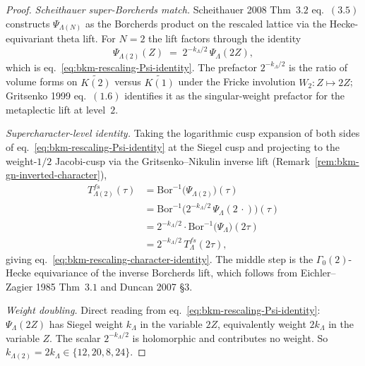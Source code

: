 \begin{proof}
\emph{Scheithauer super-Borcherds match.} Scheithauer 2008
Thm~$3.2$ eq.~$(3.5)$ constructs $\Psi_{\Lambda(N)}$ as the
Borcherds product on the rescaled lattice via the Hecke-equivariant
theta lift. For $N=2$ the lift factors through the identity
\[
 \Psi_{\Lambda(2)}(Z)
 \;=\; 2^{-k_\Lambda/2}\,\Psi_\Lambda(2Z),
\]
which is eq.~\eqref{eq:bkm-rescaling-Psi-identity}. The prefactor
$2^{-k_\Lambda/2}$ is the ratio of volume forms on
$\widetilde{K(2)}$ versus $\widetilde{K(1)}$ under the Fricke
involution $W_2\colon Z\mapsto 2Z$; Gritsenko 1999 eq.~$(1.6)$
identifies it as the singular-weight prefactor for the metaplectic
lift at level~$2$.

\emph{Supercharacter-level identity.} Taking the logarithmic cusp
expansion of both sides of
eq.~\eqref{eq:bkm-rescaling-Psi-identity} at the Siegel cusp and
projecting to the weight-$1/2$ Jacobi-cusp via the
Gritsenko--Nikulin inverse lift
(Remark~\ref{rem:bkm-gn-inverted-character}),
\begin{align*}
 T^{fs}_{\Lambda(2)}(\tau)
 &= \mathrm{Bor}^{-1}\bigl(\Psi_{\Lambda(2)}\bigr)(\tau) \\
 &= \mathrm{Bor}^{-1}\bigl(2^{-k_\Lambda/2}\,\Psi_\Lambda(2\,\cdot)\bigr)(\tau) \\
 &= 2^{-k_\Lambda/2}\cdot \mathrm{Bor}^{-1}\bigl(\Psi_\Lambda\bigr)(2\tau) \\
 &= 2^{-k_\Lambda/2}\,T^{fs}_\Lambda(2\tau),
\end{align*}
giving eq.~\eqref{eq:bkm-rescaling-character-identity}. The
middle step is the $\Gamma_0(2)$-Hecke equivariance of the
inverse Borcherds lift, which follows from Eichler--Zagier 1985
Thm~$3.1$ and Duncan 2007 \S$3$.

\emph{Weight doubling.} Direct reading from
eq.~\eqref{eq:bkm-rescaling-Psi-identity}: $\Psi_\Lambda(2Z)$ has
Siegel weight $k_\Lambda$ in the variable $2Z$, equivalently weight
$2k_\Lambda$ in the variable $Z$. The scalar $2^{-k_\Lambda/2}$ is
holomorphic and contributes no weight. So
$k_{\Lambda(2)} = 2k_\Lambda \in\{12,20,8,24\}$.


\end{proof}
